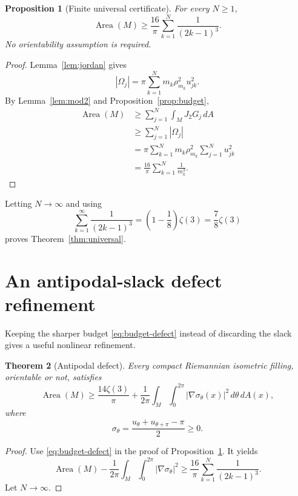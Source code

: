 \documentclass[11pt]{article}
\newtheorem{theorem}{Theorem}[section]
\newtheorem{proposition}[theorem]{Proposition}
\newcommand{\Area}{\operatorname{Area}}
\begin{document}
\begin{proposition}[Finite universal certificate]\label{prop:finite-univ}
For every $N\ge1$,
\[
        \boxed{
        \Area(M)\ge
        \frac{16}{\pi}
        \sum_{k=1}^N\frac1{(2k-1)^3}.}
\]
No orientability assumption is required.
\end{proposition}

\begin{proof}
Lemma~\ref{lem:jordan} gives
\[
 |\Omega_j|
 =
 \pi\sum_{k=1}^Nm_k\rho_{m_k}^2u_{jk}^2.
\]
By Lemma~\ref{lem:mod2} and Proposition~\ref{prop:budget},
\[
\begin{aligned}
 \Area(M)
 &\ge\sum_{j=1}^N\int_MJ_2G_j\,dA\\
 &\ge\sum_{j=1}^N|\Omega_j|\\
 &=\pi\sum_{k=1}^Nm_k\rho_{m_k}^2
   \sum_{j=1}^Nu_{jk}^2\\
 &=\frac{16}{\pi}
   \sum_{k=1}^N\frac1{m_k^3}.
\end{aligned}
\]
\end{proof}

Letting $N\to\infty$ and using
\[
 \sum_{k=1}^{\infty}\frac1{(2k-1)^3}
 =\left(1-\frac18\right)\zeta(3)
 =\frac78\zeta(3)
\]
proves Theorem~\ref{thm:universal}.

\section{An antipodal-slack defect refinement}

Keeping the sharper budget \eqref{eq:budget-defect} instead of discarding
the slack gives a useful nonlinear refinement.

\begin{theorem}[Antipodal defect]\label{thm:slack}
Every compact Riemannian isometric filling, orientable or not, satisfies
\begin{equation}\label{eq:slack-bound}
 \boxed{
 \Area(M)\ge\frac{14\zeta(3)}{\pi}
 +\frac1{2\pi}\int_M\int_0^{2\pi}
          |\nabla\sigma_\theta(x)|^2\,d\theta\,dA(x),}
\end{equation}
where
\[
        \sigma_\theta
        =\frac{u_\theta+u_{\theta+\pi}-\pi}{2}\ge0.
\]
\end{theorem}

\begin{proof}
Use \eqref{eq:budget-defect} in the proof of
Proposition~\ref{prop:finite-univ}.  It yields
\[
 \Area(M)
 -
 \frac1{2\pi}
 \int_M\int_0^{2\pi}|\nabla\sigma_\theta|^2
 \ge
 \frac{16}{\pi}\sum_{k=1}^N\frac1{(2k-1)^3}.
\]
Let $N\to\infty$.
\end{proof}
\end{document}
